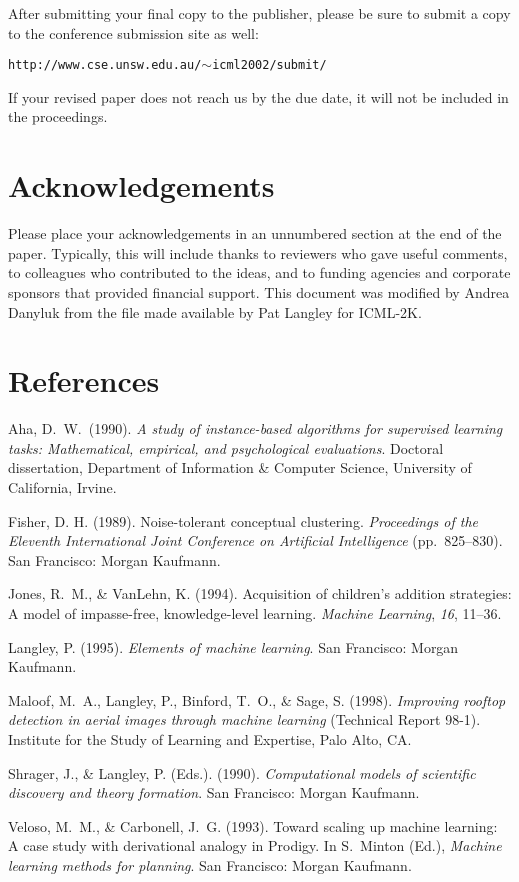 After submitting your final copy to the publisher, please be sure to
submit a copy to the conference submission site as well:
\vskip 0.1in
\begin{small}
\centerline{{\tt http://www.cse.unsw.edu.au/$\mathtt{\sim}$icml2002/submit/}}
\end{small}

If your revised paper does not reach us by the due  date, it will not
be included in the proceedings.

\section*{Acknowledgements} 
 
Please place your acknowledgements in an unnumbered section at the
end of the paper. Typically, this will include thanks to reviewers
who gave useful comments, to colleagues who contributed to the ideas, 
and to funding agencies and corporate sponsors that provided financial 
support.  This document was modified by Andrea Danyluk from the file
made available by Pat Langley for ICML-2K.

\section*{References}

{\parindent -10pt\leftskip 10pt

Aha, D.~W.~(1990). {\it A study of instance-based algorithms for
supervised learning tasks: Mathematical, empirical, and psychological
evaluations\/}. Doctoral dissertation, Department of Information \&
Computer Science, University of California, Irvine.

Fisher, D. H. (1989). Noise-tolerant conceptual clustering. {\it
Proceedings of the Eleventh International Joint Conference on Artificial
Intelligence\/} (pp.~825--830). San Francisco: Morgan Kaufmann.

Jones, R.~M., \& VanLehn, K. (1994). Acquisition of children's addition
strategies: A model of impasse-free, knowledge-level learning. {\it
Machine Learning\/}, {\it 16\/}, 11--36.

Langley, P. (1995). {\it Elements of machine learning\/}. San
Francisco: Morgan Kaufmann.

Maloof, M.\ A., Langley, P., Binford, T.\ O., \& Sage, S. (1998).
{\it Improving rooftop detection in aerial images through machine
learning\/} (Technical Report 98-1). Institute for the Study of Learning
and Expertise, Palo Alto, CA.

Shrager, J., \& Langley, P. (Eds.). (1990). {\it Computational models
of scientific discovery and theory formation\/}. San Francisco: Morgan 
Kaufmann.

Veloso, M.\ M., \& Carbonell, J.\ G. (1993). Toward scaling up machine
learning: A case study with derivational analogy in {\sc Prodigy}. In 
S.~Minton (Ed.), {\it Machine learning methods for planning}. San 
Francisco: Morgan Kaufmann.

}

 
